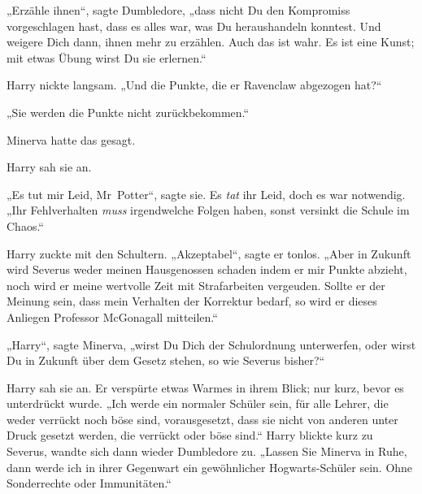 „Erzähle ihnen“, sagte Dumbledore, „dass nicht Du den Kompromiss vorgeschlagen hast, dass es alles war, was Du heraushandeln konntest. Und weigere Dich dann, ihnen mehr zu erzählen. Auch das ist wahr. Es ist eine Kunst; mit etwas Übung wirst Du sie erlernen.“

Harry nickte langsam. „Und die Punkte, die er Ravenclaw abgezogen hat?“

„Sie werden die Punkte nicht zurückbekommen.“

Minerva hatte das gesagt.

Harry sah sie an.

„Es tut mir Leid, Mr~Potter“, sagte sie. Es \emph{tat} ihr Leid, doch es war notwendig. „Ihr Fehlverhalten \emph{muss} irgendwelche Folgen haben, sonst versinkt die Schule im Chaos.“

Harry zuckte mit den Schultern. „Akzeptabel“, sagte er tonlos. „Aber in Zukunft wird Severus weder meinen Hausgenossen schaden indem er mir Punkte abzieht, noch wird er meine wertvolle Zeit mit Strafarbeiten vergeuden. Sollte er der Meinung sein, dass mein Verhalten der Korrektur bedarf, so wird er dieses Anliegen Professor McGonagall mitteilen.“

„Harry“, sagte Minerva, „wirst Du Dich der Schulordnung unterwerfen, oder wirst Du in Zukunft über dem Gesetz stehen, so wie Severus bisher?“

Harry sah sie an. Er verspürte etwas Warmes in ihrem Blick; nur kurz, bevor es unterdrückt wurde. „Ich werde ein normaler Schüler sein, für alle Lehrer, die weder verrückt noch böse sind, vorausgesetzt, dass sie nicht von anderen unter Druck gesetzt werden, die verrückt oder böse sind.“ Harry blickte kurz zu Severus, wandte sich dann wieder Dumbledore zu. „Lassen Sie Minerva in Ruhe, dann werde ich in ihrer Gegenwart ein gewöhnlicher Hogwarts-Schüler sein. Ohne Sonderrechte oder Immunitäten.“

